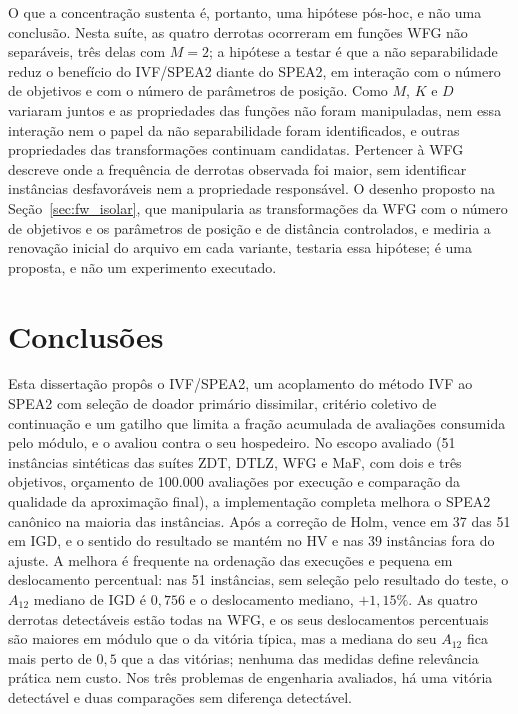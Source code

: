 O que a concentração sustenta é, portanto, uma hipótese pós-hoc, e não uma conclusão. Nesta suíte, as quatro derrotas ocorreram em funções WFG não separáveis, três delas com $M = 2$; a hipótese a testar é que a não separabilidade reduz o benefício do IVF/SPEA2 diante do SPEA2, em interação com o número de objetivos e com o número de parâmetros de posição. Como $M$, $K$ e $D$ variaram juntos e as propriedades das funções não foram manipuladas, nem essa interação nem o papel da não separabilidade foram identificados, e outras propriedades das transformações continuam candidatas. Pertencer à WFG descreve onde a frequência de derrotas observada foi maior, sem identificar instâncias desfavoráveis nem a propriedade responsável. O desenho proposto na Seção~\ref{sec:fw_isolar}, que manipularia as transformações da WFG com o número de objetivos e os parâmetros de posição e de distância controlados, e mediria a renovação inicial do arquivo em cada variante, testaria essa hipótese; é uma proposta, e não um experimento executado.

\section{Conclusões}
\label{sec:conclusoes}

Esta dissertação propôs o IVF/SPEA2, um acoplamento do método IVF ao SPEA2 com seleção de doador primário dissimilar, critério coletivo de continuação e um gatilho que limita a fração acumulada de avaliações consumida pelo módulo, e o avaliou contra o seu hospedeiro. No escopo avaliado (51 instâncias sintéticas das suítes ZDT, DTLZ, WFG e MaF, com dois e três objetivos, orçamento de 100.000 avaliações por execução e comparação da qualidade da aproximação final), a implementação completa melhora o SPEA2 canônico na maioria das instâncias. Após a correção de Holm, vence em 37 das 51 em IGD, e o sentido do resultado se mantém no HV e nas 39 instâncias fora do ajuste. A melhora é frequente na ordenação das execuções e pequena em deslocamento percentual: nas 51 instâncias, sem seleção pelo resultado do teste, o $A_{12}$ mediano de IGD é $0{,}756$ e o deslocamento mediano, $+1{,}15\%$. As quatro derrotas detectáveis estão todas na WFG, e os seus deslocamentos percentuais são maiores em módulo que o da vitória típica, mas a mediana do seu $A_{12}$ fica mais perto de $0{,}5$ que a das vitórias; nenhuma das medidas define relevância prática nem custo. Nos três problemas de engenharia avaliados, há uma vitória detectável e duas comparações sem diferença detectável.

